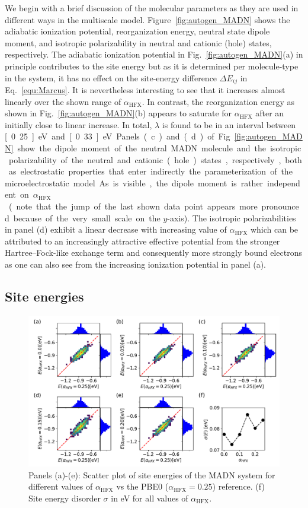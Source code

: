 \documentclass[%
 reprint,
superscriptaddress,
 amsmath,amssymb,
 aps,
prb,
floatfix
]{revtex4-2}
\newcommand{\ahfx}{\ensuremath{\alpha_\text{HFX}}\xspace}
\begin{document}
We begin with a brief discussion of the molecular parameters as they are used in different ways in the multiscale model. Figure~\ref{fig:autogen_MADN} shows the adiabatic ionization potential, reorganization energy, neutral state dipole moment, and isotropic polarizability in neutral and cationic (hole) states, respectively. The adiabatic ionization potential in Fig.~\ref{fig:autogen_MADN}(a) in principle contributes to the site energy but as it is determined per molecule-type in the system, it has no effect on the site-energy difference $\Delta E_{ij}$ in Eq.~\ref{equ:Marcus}. It is nevertheless interesting to see that it increases almost linearly over the shown range of \ahfx. In contrast, the reorganization energy as shown in Fig.~\ref{fig:autogen_MADN}(b) appears to saturate for \ahfx after an initially close to linear increase. In total, $\lambda$ is found to be in an interval between \unit[0.25]{eV} and \unit[0.33]{eV}. Panels (c) and (d) of Fig.~\ref{fig:autogen_MADN} show the dipole moment of the neutral MADN molecule and the isotropic polarizability of the neutral and cationic (hole) states, respectively, both as electrostatic properties that enter indirectly the parameterization of the microelectrostatic model. As is visible, the dipole moment is rather independent on \ahfx (note that the jump of the last shown data point appears more pronounced because of the very small scale on the $y$-axis). The isotropic polarizabilities in panel (d) exhibit a linear decrease with increasing value of \ahfx which can be attributed to an increasingly attractive effective potential from the stronger Hartree--Fock-like exchange term and consequently more strongly bound electrons as one can also see from the increasing ionization potential in panel (a).  

\subsection{Site energies}

\begin{figure}[tbp]
  \centering
  \includegraphics[width=\linewidth]{fig3.pdf}
  \caption{Panels (a)-(e): Scatter plot of site energies of the MADN system for different values of \ahfx vs the PBE0 ($\ahfx=0.25$) reference. (f) Site energy disorder $\sigma$ in \unit[]{eV} for all values of \ahfx.}
  \label{fig:E_qmmm_MADN}
\end{figure}
\end{document}
